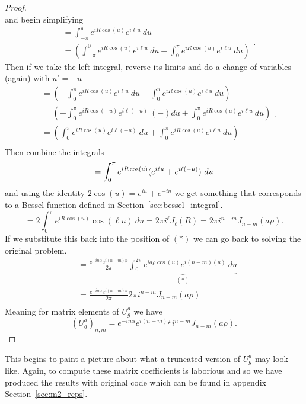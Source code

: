 \documentclass{article}
\begin{document}
\begin{proof}
\[    \]%
    and begin simplifying
    \[%
        \begin{split}
            &= \int^{\pi}_{-\pi} e^{iR\cos\left(u\right)}e^{i\ell u} \ du \\
            &= \left( \int^{0}_{-\pi} e^{iR\cos\left(u\right)}e^{i\ell u} \ du + \int^{\pi}_{0} e^{iR\cos\left(u\right)}e^{i\ell u} \ du \right)
        \end{split} 
    .\]%
    Then if we take the left integral, reverse its limits and do a change of variables (again) with $u' = -u$
    \[%
        \begin{split}
            &= \left( -\int^{\pi}_{0} e^{iR\cos\left(u\right)}e^{i\ell u} \ du + \int^{\pi}_{0} e^{iR\cos\left(u\right)}e^{i\ell u} \ du \right) \\
            &= \left( -\int^{\pi}_{0} e^{iR\cos\left(-u\right)}e^{i\ell(-u)} \ (-)du + \int^{\pi}_{0} e^{iR\cos\left(u\right)}e^{i\ell u} \ du \right) \\
            &=  \left( \int^{\pi}_{0} e^{iR\cos\left(u\right)}e^{i\ell(-u)} \ du + \int^{\pi}_{0} e^{iR\cos\left(u\right)}e^{i\ell u} \ du \right) \\
        \end{split}
    .\]%
    Then combine the integrals
    \[%
        = \int^{\pi}_{0} e^{iR\cos\left(u\right)} (e^{i\ell u} + e^{i\ell(-u)}) \ du  \\
    \]%
    and using the identity $2 \cos\left(u\right) = e^{iu} + e^{-iu}$ we get something that corresponds to a Bessel function defined in Section~\ref{sec:bessel_integral}.
    \[%
        = 2\int^{\pi}_{0} e^{iR\cos\left(u\right)}  \cos\left(\ell u\right) \ du = 2\pi i^{\ell} J_{\ell}(R) = 2\pi i^{n-m} J_{n-m}(a\rho)
    .\]%
    If we substitute this back into the position of $(*)$ we can go back to solving the original problem.
    \[%
        \begin{split}
            &= \frac{e^{-in\alpha} e^{i(n-m)\varphi}}{2\pi} \underbrace{\int^{2\pi}_{0} e^{ia\rho \cos\left(u\right)}e^{i (n-m)(u)} \ du}_{(*)} \\
            & = \frac{e^{-in\alpha} e^{i(n-m)\varphi}}{2\pi} 2\pi i^{n-m} J_{n-m}(a\rho) \\ 
        \end{split}
    \]%
    Meaning for matrix elements of $U^{a}_{g}$ we have
    \[%
            \left(U^{a}_{g}\right)_{n,m} =  e^{-in\alpha} e^{i(n-m)\varphi}i^{n-m}J_{n-m}(a\rho)   
    .\]%
\end{proof}

This begins to paint a picture about what a truncated version of $U^{a}_{g}$ may look like. Again, to compute these matrix coefficients is laborious and so we have produced the results with original code which can be found in appendix Section~\ref{sec:m2_reps}.
\end{document}
